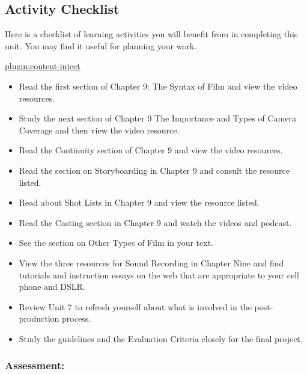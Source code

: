\documentclass[
]{book}
\providecommand{\tightlist}{%
  \setlength{\itemsep}{0pt}\setlength{\parskip}{0pt}}
\begin{document}
\hypertarget{activity-checklist-8}{%
\subsection*{Activity Checklist}\label{activity-checklist-8}}

Here is a checklist of learning activities you will benefit from in completing this unit. You may find it useful for planning your work.

\href{_schedule}{plugin:content-inject}

\begin{itemize}
\tightlist
\item
  Read the first section of Chapter 9: The Syntax of Film and view the video resources.\\
\item
  Study the next section of Chapter 9 The Importance and Types of Camera Coverage and then view the video resource.\\
\item
  Read the Continuity section of Chapter 9 and view the video resources.\\
\item
  Read the section on Storyboarding in Chapter 9 and consult the resource listed.\\
\item
  Read about Shot Lists in Chapter 9 and view the resource listed.\\
\item
  Read the Casting section in Chapter 9 and watch the videos and podcast.\\
\item
  See the section on Other Types of Film in your text.
\item
  View the three resources for Sound Recording in Chapter Nine and find tutorials and instruction essays on the web that are appropriate to your cell phone and DSLR.\\
\item
  Review Unit 7 to refresh yourself about what is involved in the post-production process.\\
\item
  Study the guidelines and the Evaluation Criteria closely for the final project.
\end{itemize}

\hypertarget{assessment-8}{%
\subsubsection*{Assessment:}\label{assessment-8}}
\end{document}
